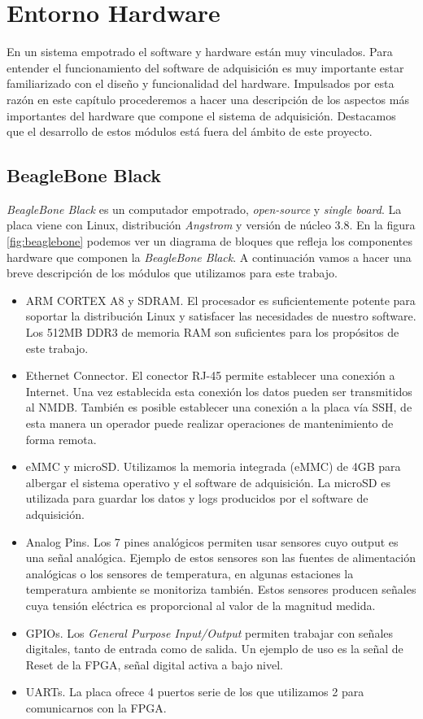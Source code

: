 \chapter{Entorno Hardware}
\label{entornoHW}

En un sistema empotrado el software y hardware están muy vinculados. Para entender el funcionamiento del software de adquisición es muy importante
estar familiarizado con el diseño y funcionalidad del hardware. Impulsados por esta razón en este capítulo procederemos a hacer una descripción de los
aspectos más importantes del hardware que compone el sistema de adquisición. Destacamos que el desarrollo de estos módulos está fuera del ámbito de
este proyecto.
\section{BeagleBone Black}
	\emph{BeagleBone Black}\cite{Beagle}\cite{BeagleWiki} es un computador empotrado, \emph{open-source} y \emph{single board}. La placa viene con
	Linux, distribución \emph{Angstrom} y versión de núcleo 3.8. En la figura \ref{fig:beaglebone} podemos ver un diagrama de bloques que refleja
	los componentes hardware que componen la \emph{BeagleBone Black}. A continuación vamos a hacer una breve descripción de los módulos que
	utilizamos para este trabajo.
	\begin{itemize}
		\item 	ARM CORTEX A8\cite{BeagleCore} y SDRAM. El procesador es suficientemente potente para soportar la distribución Linux y
			satisfacer las necesidades de nuestro software. Los 512MB DDR3 de memoria RAM son suficientes para los propósitos de este
			trabajo.
		\item 	Ethernet Connector. El conector RJ-45 permite establecer una conexión a Internet. Una vez establecida esta conexión los datos
			pueden ser transmitidos al NMDB. También es posible establecer una conexión a la placa vía SSH, de esta manera un operador
			puede realizar operaciones de mantenimiento de forma remota.
		\item	eMMC y microSD. Utilizamos la memoria integrada (eMMC) de 4GB para albergar el sistema operativo y el software de
			adquisición. La microSD es utilizada para guardar los datos y logs producidos por el software de adquisición.
		\item 	Analog Pins. Los 7 pines analógicos permiten usar sensores cuyo output es una señal analógica. Ejemplo de estos sensores son
			las fuentes de alimentación analógicas o los sensores de temperatura, en algunas estaciones la temperatura ambiente se
			monitoriza también. Estos sensores producen señales cuya tensión eléctrica es proporcional al valor de la magnitud medida. 
		\item 	GPIOs. Los \emph{General Purpose Input/Output} permiten trabajar con señales digitales, tanto de entrada como de salida. Un
			ejemplo de uso es la señal de Reset de la FPGA, señal digital activa a bajo nivel.
		\item	UARTs. La placa ofrece 4 puertos serie de los que utilizamos 2 para comunicarnos con la FPGA.
	\end{itemize}

